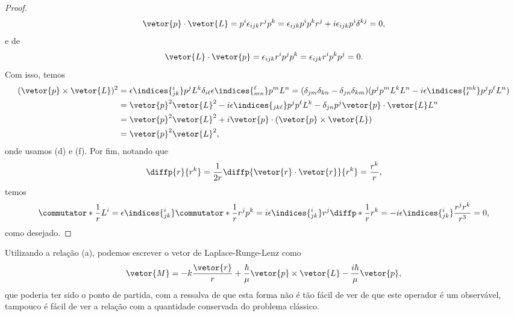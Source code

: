 \begin{proof}
   \begin{equation*}
      \vetor{p} \cdot \vetor{L} = p^i \epsilon_{ijk} r^j p^k = \epsilon_{ijk} p^i p^k r^j + i\epsilon_{ijk} p^i  \delta^{kj} = 0,
   \end{equation*}
   e de
   \begin{equation*}
      \vetor{L}\cdot\vetor{p} = \epsilon_{ijk} r^i p^j p^k = \epsilon_{ijk} r^i p^k p^j = 0.
   \end{equation*}
   Com isso, temos
   \begin{align*}
      (\vetor{p}\times\vetor{L})^2 &= \epsilon\indices{^i_{jk}} p^j L^k\delta_{i\ell} \epsilon\indices{^\ell_{mn}}p^m L^n = (\delta_{jm} \delta_{kn} - \delta_{jn}\delta_{km}) (p^j p^m L^k L^n - i \epsilon\indices{^{mk}_\ell}p^jp^\ell L^n)\\
                                   &= \vetor{p}^2 \vetor{L}^2 -i \epsilon\indices{_{jk\ell}}p^j p^\ell L^k - \delta_{jn}p^j \vetor{p}\cdot\vetor{L} L^n\\
                                   &= \vetor{p}^2 \vetor{L}^2 + i \vetor{p} \cdot (\vetor{p} \times \vetor{L}) \\
                                   &= \vetor{p}^2 \vetor{L}^2,
   \end{align*}
   onde usamos (d) e (f). Por fim, notando que
   \begin{equation*}
      \diffp{r}{r^k} = \frac1{2r}\diffp{\vetor{r} \cdot \vetor{r}}{r^k} = \frac{r^k}{r},
   \end{equation*}
   temos
   \begin{equation*}
      \commutator*{\frac{1}{r}}{L^i} = \epsilon\indices{^i_{jk}} \commutator*{\frac{1}{r}}{r^j p^k} = i\epsilon\indices{^i_{jk}} r^j \diffp*{\frac{1}{r}}{r^k} = -i\epsilon\indices{^i_{jk}} \frac{r^j r^k}{r^3} = 0,
   \end{equation*}
   como desejado.
\end{proof}

Utilizando a relação (a), podemos escrever o vetor de Laplace-Runge-Lenz como
\begin{equation*}
   \vetor{M} = -k\frac{\vetor{r}}{r} + \frac{\hbar}{\mu} \vetor{p} \times\vetor{L} - \frac{i \hbar}{\mu}\vetor{p},
\end{equation*}
que poderia ter sido o ponto de partida, com a ressalva de que esta forma não é tão fácil de ver de que este operador é um observável, tampouco é fácil de ver a relação com a quantidade conservada do problema clássico.

